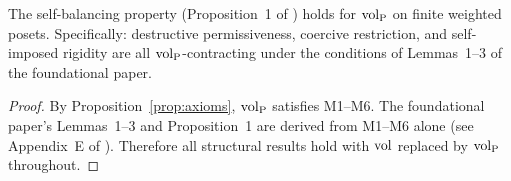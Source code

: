 \begin{theorem}
\label{thm:self_balancing_poset}
The self-balancing property (Proposition~1 of \citet{lasser2026gfm}) holds for
    ${\operatorname{vol}_{\mathrm{P}}}$ on finite weighted posets. Specifically: destructive
    permissiveness, coercive restriction, and self-imposed rigidity are all
    ${\operatorname{vol}_{\mathrm{P}}}$-contracting under the conditions of Lemmas~1--3 of the foundational
    paper.
\end{theorem}

\begin{proof}
By Proposition~\ref{prop:axioms}, ${\operatorname{vol}_{\mathrm{P}}}$ satisfies M1--M6. The foundational
paper's Lemmas~1--3 and Proposition~1 are derived from M1--M6 alone (see
Appendix~E of \citet{lasser2026gfm}). Therefore all structural results hold
with $\operatorname{vol}$ replaced by ${\operatorname{vol}_{\mathrm{P}}}$ throughout.
\end{proof}
